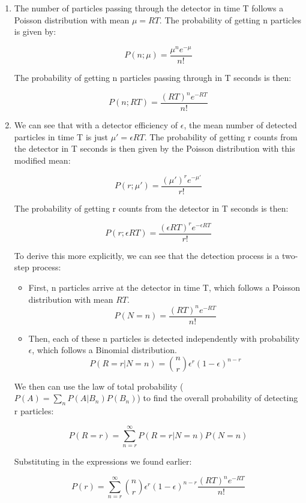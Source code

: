 \documentclass[10pt]{article}
\begin{document}
\divider

\begin{enumerate}[label=(\alph*)]
	\item The number of particles passing through the detector in time T follows a Poisson distribution with mean $\mu = RT$. The probability of getting n particles is given by:

	      \[ P(n; \mu) = \frac{\mu^n e^{-\mu}}{n!} \]

	      The probability of getting n particles passing through in T seconds is then:

	      \[ \boxed{P(n; RT) = \frac{(RT)^n e^{-RT}}{n!}} \]

	\item We can see that with a detector efficiency of $\epsilon$, the mean number of detected particles in time T is just $\mu' = \epsilon RT$. The probability of getting r counts from the detector in T seconds is then given by the Poisson distribution with this modified mean:

	      \[ P(r; \mu') = \frac{(\mu')^r e^{-\mu'}}{r!} \]

	      The probability of getting r counts from the detector in T seconds is then:

	      \[ \boxed{P(r; \epsilon RT) = \frac{(\epsilon RT)^r e^{-\epsilon RT}}{r!}} \]

	      To derive this more explicitly, we can see that the detection process is a two-step process:

	      \begin{itemize}[label={--}]
		      \item First, n particles arrive at the detector in time T, which follows a Poisson distribution with mean $RT$.
		            \[ P(N = n) = \frac{(RT)^n e^{-RT}}{n!} \]
		      \item Then, each of these n particles is detected independently with probability $\epsilon$, which follows a Binomial distribution.
		            \[ P(R = r | N = n) = \binom{n}{r} \epsilon^r (1 - \epsilon)^{n - r} \]
	      \end{itemize}

	      We then can use the law of total probability ($P(A) = \sum_n P(A | B_n) P(B_n)$) to find the overall probability of detecting r particles:

	      \[ P(R=r) = \sum_{n=r}^{\infty} P(R=r | N=n) P(N=n) \]

	      Substituting in the expressions we found earlier:

	      \[ P(r) = \sum_{n=r}^{\infty} \binom{n}{r} \epsilon^r (1 - \epsilon)^{n - r} \frac{(RT)^n e^{-RT}}{n!} \]


\end{enumerate}
\end{document}
